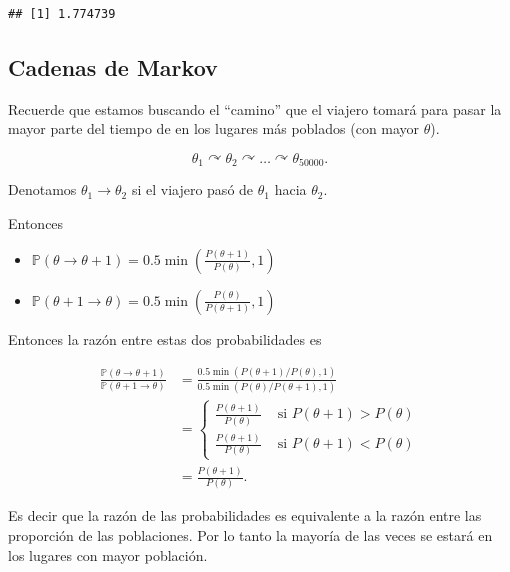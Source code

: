 \documentclass[
  12pt,
]{book}
\providecommand{\tightlist}{%
  \setlength{\itemsep}{0pt}\setlength{\parskip}{0pt}}
\theoremstyle{definition}
\theoremstyle{definition}
\theoremstyle{definition}
\theoremstyle{definition}
\theoremstyle{remark}
\begin{document}
\begin{verbatim}
## [1] 1.774739
\end{verbatim}

\hypertarget{cadenas-de-markov}{%
\subsection{Cadenas de Markov}\label{cadenas-de-markov}}

Recuerde que estamos buscando el ``camino'' que el viajero tomará para pasar la mayor parte del tiempo de en los lugares más poblados (con mayor \(\theta\)).

\begin{equation*}
\theta_{1} \curvearrowright \theta_{2} \curvearrowright \ldots \curvearrowright \theta_{50000}.
\end{equation*}

Denotamos \(\theta_{1}\to\theta_{2}\) si el viajero pasó de \(\theta_{1}\) hacia \(\theta_{2}\).

Entonces

\begin{itemize}
\tightlist
\item
  \(\mathbb{P}\left(\theta \rightarrow \theta+1\right)=0.5 \min \left(\frac{P(\theta+1)}{P(\theta)} , 1\right)\)
\item
  \(\mathbb{P}\left(\theta + 1 \rightarrow \theta\right)=0.5 \min \left(\frac{P(\theta)}{P(\theta+1)} , 1\right)\)
\end{itemize}

Entonces la razón entre estas dos probabilidades es

\begin{align*}
 \frac{\mathbb{P}\left(\theta \rightarrow \theta+1\right)}{\mathbb{P}\left(\theta +1 \rightarrow \theta\right)}
   & =\frac{0.5 \min (P(\theta+1) / P(\theta), 1)}{0.5 \min (P(\theta) / P(\theta+1), 1)} \\
   & =\left\{\begin{array}{ll}
  \frac{P(\theta+1)}{P(\theta) }
    & \text { si } P(\theta+1)>P(\theta) \\
  \frac{P(\theta+1) }{P(\theta)}
    & \text { si } P(\theta+1)<P(\theta)
 \end{array}\right.                                             \\
 \, & =\frac{P(\theta+1)}{P(\theta)}.
\end{align*}

Es decir que la razón de las probabilidades es equivalente a la razón entre las proporción de las poblaciones. Por lo tanto la mayoría de las veces se estará en los lugares con mayor población.
\end{document}

